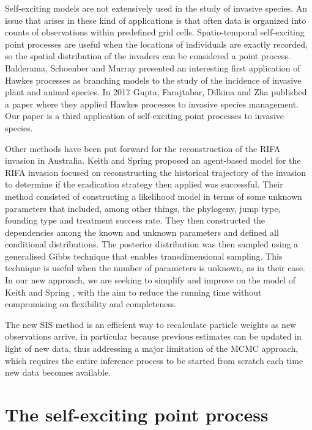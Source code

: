 \documentclass{article}
\begin{document}
Self-exciting models are not extensively used in the study of invasive species. An issue that arises in these kind of applications is that often data is organized into counts of observations within predefined grid cells. Spatio-temporal self-exciting point processes are useful when the locations of individuals are exactly recorded, so the spatial distribution of the invaders can be considered a point process. Balderama, Schoenber and Murray \cite{Balderama} presented an interesting first application of Hawkes processes as branching models to the study of the incidence of invasive plant and animal species. In 2017 Gupta, Farajtabar, Dilkina and Zha \cite{Gupta} published a paper where they applied Hawkes processes to invasive species management. Our paper is a third application of self-exciting point processes to invasive species. 

Other methods have been put forward for the reconstruction of the RIFA invasion in Australia. Keith and Spring \cite{Keith} proposed an agent-based model for the RIFA invasion focused on reconstructing the historical trajectory of the invasion to determine if the eradication strategy then applied was successful. Their method consisted of constructing a likelihood model in terms of some unknown parameters that included, among other things, the phylogeny, jump type, founding type and treatment success rate. They then constructed the dependencies among the known and unknown parameters and defined all conditional distributions. The posterior distribution was then sampled using a generalised Gibbs technique \cite{Keith2004} that enables transdimensional sampling. This technique is useful when the number of parameters is unknown, as in their case.
In our new approach, we are seeking to simplify and improve on the model of Keith and Spring \cite{Keith}, with the aim to reduce the running time without compromising on flexibility and completeness.

The new SIS method is an efficient way to recalculate particle weights as new observations arrive, in particular because previous estimates can be updated in light of new data, thus addressing a major limitation of the MCMC approach, which requires the entire inference process to be started from scratch each time new data becomes available.






\section{The self-exciting point process}\label{section:model}
\end{document}
